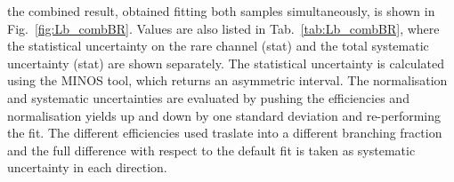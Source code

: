 %
%
%
%
%
%
the combined result, obtained fitting both samples simultaneously, is shown in Fig.~\ref{fig:Lb_combBR}.
Values are also listed in Tab.~\ref{tab:Lb_combBR}, where the statistical
uncertainty on the rare channel (stat) and the total systematic uncertainty (stat) are shown separately.
The statistical uncertainty is calculated using the MINOS tool, which returns an asymmetric interval.
The normalisation and systematic uncertainties are evaluated by pushing the efficiencies and normalisation yields
up and down by one standard deviation and re-performing the fit. %
The different efficiencies used traslate into a different branching fraction and the full difference with respect 
to the default  fit is taken as systematic uncertainty in each direction.



